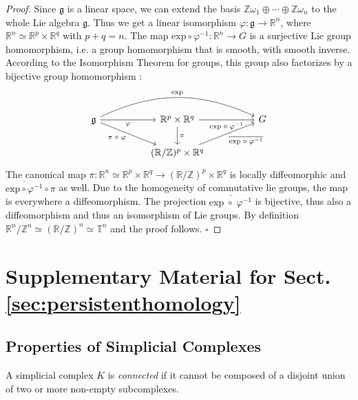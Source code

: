 \documentclass[envcountsect,runningheads]{llncs}
\renewcommand{\qed}{\hfill$\square$}
\begin{document}
\begin{proof}
Since $\mathfrak{g}$ is a linear space, we can extend the basis $\mathbb{Z}\omega_1 \oplus \cdots \oplus \mathbb{Z} \omega_n$ to the whole Lie algebra $\mathfrak{g}$. Thus we get a linear isomorphism $\varphi: \mathfrak{g} \rightarrow \mathbb{R}^n$, where $\mathbb{R}^n \simeq \mathbb{R}^p \times \mathbb{R}^q$ with $p+q = n$. The map $\text{exp} \circ \varphi^{-1}: \mathbb{R}^n \rightarrow G$ is a surjective Lie group homomorphism, i.e. a group homomorphism that is smooth, with smooth inverse. According to the Isomorphism Theorem for groups, this group also factorizes by a bijective group homomorphism \cite[pp.~5-7]{van2003lie}:
\[
\begin{tikzcd}[column sep=huge]
    \displaystyle \mathfrak{g}
    \arrow[swap]{r}{\varphi}
    \arrow[bend left=25]{rr}{\text{exp}}
    \arrow[swap]{dr}{\pi \; \circ \; \varphi}
&   \mathbb{R}^p \times \mathbb{R}^q
    \arrow{d}{\pi}
    \arrow[swap]{r}{\text{exp} \; \circ \; \varphi^{-1}}
&   G\\	
&   (\mathbb{R}/\mathbb{Z})^p \times \mathbb{R}^q 
	\arrow[swap]{ur}{\overline{\text{exp} \; \circ \; \varphi^{-1}}}
\end{tikzcd}
\]
The canonical map $\pi: \mathbb{R}^n \simeq \mathbb{R}^p \times \mathbb{R}^q \rightarrow (\mathbb{R}/\mathbb{Z})^p \times \mathbb{R}^q$ is locally diffeomorphic and $\overline{\text{exp} \circ \varphi^{-1}} \circ \pi$ as well. Due to the homogeneity of commutative lie groups, the map is everywhere a diffeomorphism. The projection $\overline{\text{exp} \; \circ \; \varphi^{-1}}$ is bijective, thus also a diffeomorphism and thus an isomorphism of Lie groups. By definition $\mathbb{R}^n/\mathbb{Z}^n \simeq (\mathbb{R}/\mathbb{Z})^n \simeq \mathbb{T}^n$ and the proof follows. \qed
\end{proof}

\section{Supplementary Material for Sect. \ref{sec:persistenthomology}}
\label{persistenthomologyproofs}
\subsection{Properties of Simplicial Complexes}
\begin{definition}
A simplicial complex $K$ is \textit{connected} if it cannot be composed of a disjoint union of two or more non-empty subcomplexes.
\end{definition}
\end{document}

